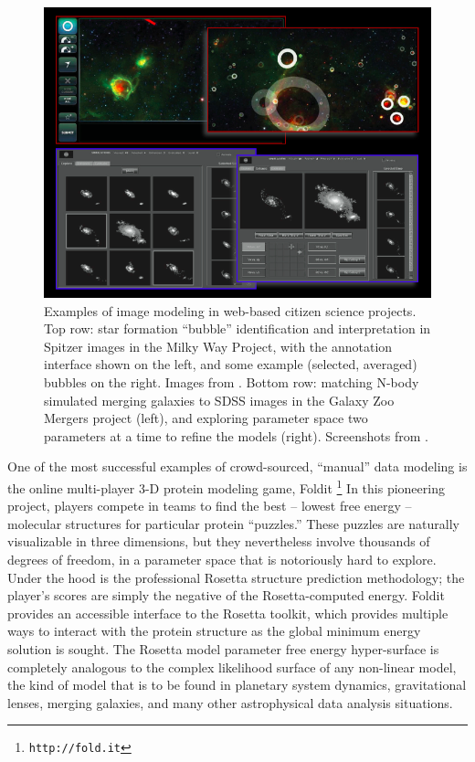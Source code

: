 \documentclass{ar2e}
\def\CaseStudy#1{\noindent{\it\bf #1 \,\,\,\,}}
\def\url#1{\texttt{#1}}
\begin{document}
\begin{figure}[!ht]
\centering\includegraphics[width=\linewidth]{figs/modeling.png}
\caption{Examples of image modeling in web-based citizen science projects. Top
row: star formation ``bubble'' identification and interpretation in Spitzer
images in the Milky Way Project, with the annotation interface shown on the
left, and some example (selected, averaged) bubbles on the right. Images from
\citet{Simpson++2012MWP}. Bottom row: matching N-body simulated merging
galaxies to SDSS images in the Galaxy Zoo Mergers project (left), and
exploring parameter space two parameters at a time to refine the models
(right). Screenshots from \citet{HolincheckEtal2010}.}
\label{fig:modeling}
\end{figure}



\CaseStudy{Protein Modeling with Foldit}  
One of the most successful examples of crowd-sourced, ``manual'' data modeling is the
online multi-player 3-D protein modeling game,  Foldit
\citep{Cooper++2010}\footnote{\url{http://fold.it}} In this pioneering
project, players compete in teams to find the best -- lowest free energy --
molecular structures for particular protein ``puzzles.'' 
These puzzles are naturally visualizable in three dimensions, but 
they nevertheless involve thousands of degrees of freedom, in a parameter
space that is notoriously hard to explore.
Under the hood is the
professional Rosetta structure prediction methodology; the player's scores are
simply the negative of the Rosetta-computed energy. Foldit provides an
accessible interface to the Rosetta toolkit, which provides multiple ways to
interact with the protein structure as the global minimum energy solution is
sought. The Rosetta model parameter free energy hyper-surface is completely analogous
to the complex likelihood surface of any non-linear model, the kind of model
that is to be found in planetary system dynamics, gravitational lenses,
merging galaxies, and many other astrophysical data analysis situations. 
\end{document}
